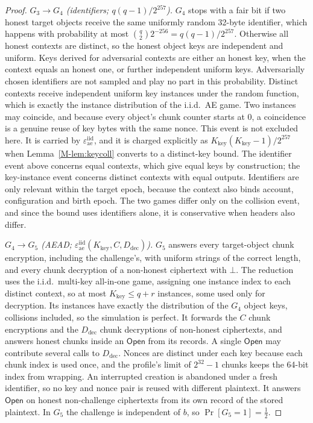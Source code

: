 \documentclass[pdflatex,sn-mathphys-num]{sn-jnl}
\theoremstyle{plain}
\begin{document}
\begin{proof}
\emph{$G_3\to G_4$ (identifiers; $q(q-1)/2^{257}$).} $G_4$ stops with a fair bit if two honest target objects receive the same uniformly random 32-byte identifier, which happens with probability at most $\binom q2 2^{-256}=q(q-1)/2^{257}$. Otherwise all honest contexts are distinct, so the honest object keys are independent and uniform. Keys derived for adversarial contexts are either an honest key, when the context equals an honest one, or further independent uniform keys. Adversarially chosen identifiers are not sampled and play no part in this probability. Distinct contexts receive independent uniform key instances under the random function, which is exactly the instance distribution of the i.i.d.\ AE game. Two instances may coincide, and because every object's chunk counter starts at $0$, a coincidence is a genuine reuse of key bytes with the same nonce. This event is not excluded here. It is carried by $\varepsilon^{\mathrm{iid}}_{\mathrm{ae}}$, and it is charged explicitly as $K_{\mathrm{key}}(K_{\mathrm{key}}-1)/2^{257}$ when Lemma~\ref{M-lem:keycoll} converts to a distinct-key bound. The identifier event above concerns equal contexts, which give equal keys by construction; the key-instance event concerns distinct contexts with equal outputs. Identifiers are only relevant within the target epoch, because the context also binds account, configuration and birth epoch. The two games differ only on the collision event, and since the bound uses identifiers alone, it is conservative when headers also differ.

\emph{$G_4\to G_5$ (AEAD; $\varepsilon^{\mathrm{iid}}_{\mathrm{ae}}(K_{\mathrm{key}},C,D_{\mathrm{dec}})$).} $G_5$ answers every target-object chunk encryption, including the challenge's, with uniform strings of the correct length, and every chunk decryption of a non-honest ciphertext with $\bot$. The reduction uses the i.i.d.\ multi-key all-in-one game, assigning one instance index to each distinct context, so at most $K_{\mathrm{key}}\le q+r$ instances, some used only for decryption. Its instances have exactly the distribution of the $G_4$ object keys, collisions included, so the simulation is perfect. It forwards the $C$ chunk encryptions and the $D_{\mathrm{dec}}$ chunk decryptions of non-honest ciphertexts, and answers honest chunks inside an $\mathsf{Open}$ from its records. A single $\mathsf{Open}$ may contribute several calls to $D_{\mathrm{dec}}$. Nonces are distinct under each key because each chunk index is used once, and the profile's limit of $2^{32}-1$ chunks keeps the 64-bit index from wrapping. An interrupted creation is abandoned under a fresh identifier, so no key and nonce pair is reused with different plaintext. It answers $\mathsf{Open}$ on honest non-challenge ciphertexts from its own record of the stored plaintext. In $G_5$ the challenge is independent of $b$, so $\Pr[G_5=1]=\tfrac12$.


\end{proof}
\end{document}

